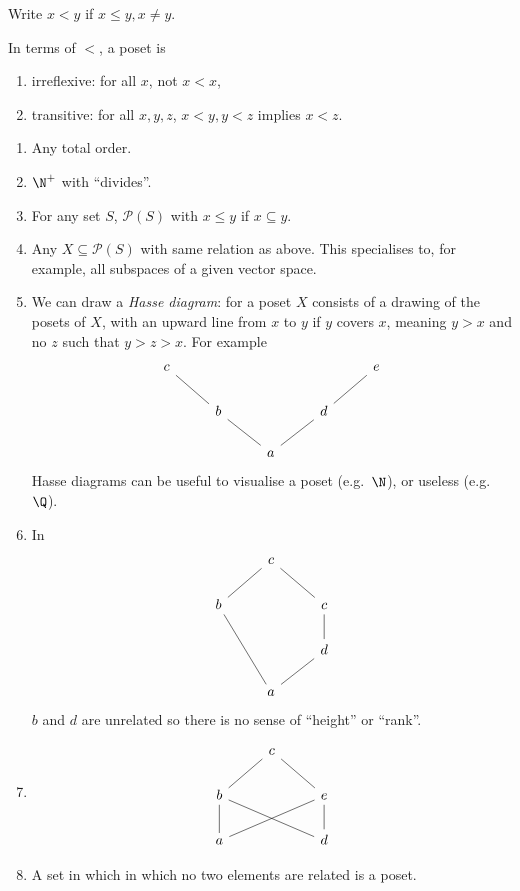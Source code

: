 \documentclass[a4paper]{article}
\begin{document}
\begin{notation}
  Write \(x < y\) if \(x \leq y, x \neq y\).

  In terms of \(<\), a poset is
  \begin{enumerate}
  \item irreflexive: for all \(x\), not \(x < x\),
  \item transitive: for all \(x, y, z\), \(x < y, y < z\) implies \(x < z\).
  \end{enumerate}
\end{notation}

\begin{eg}\leavevmode
  \begin{enumerate}
  \item Any total order.
  \item \(\N^+\) with ``divides''.
  \item For any set \(S\), \(\mathcal P(S)\) with \(x \leq y\) if \(x \subseteq y\).
  \item Any \(X \subseteq \mathcal P(S)\) with same relation as above. This specialises to, for example, all subspaces of a given vector space.
  \item We can draw a \emph{Hasse diagram}: for a poset \(X\) consists of a drawing of the posets of \(X\), with an upward line from \(x\) to \(y\) if \(y\) covers \(x\), meaning \(y > x\) and no \(z\) such that \(y > z > x\). For example
    \[
      \begin{tikzcd}
        c \ar[dr, dash] & & & & e \ar[dl, dash] \\
        & b \ar[dr, dash] & & d \ar[dl, dash] \\
        & & a
      \end{tikzcd}
    \]
    Hasse diagrams can be useful to visualise a poset (e.g.\ \(\N\)), or useless (e.g.\ \(\Q\)).
  \item In
    \[
      \begin{tikzcd}
        & c \ar[dl, dash] \ar[dr, dash] \\
        b \ar[ddr, dash] & & c \ar[d, dash] \\
        & & d \ar[dl, dash] \\
        & a
      \end{tikzcd}
    \]
    \(b\) and \(d\) are unrelated so there is no sense of ``height'' or ``rank''.
  \item
    \[
      \begin{tikzcd}
        & c \ar[dl, dash] \ar[dr, dash] \\
        b \ar[d, dash] \ar[drr, dash] & & e \ar[d, dash] \ar[dll, dash] \\
        a & & d
      \end{tikzcd}
    \]
  \item A set in which in which no two elements are related is a poset.
  \end{enumerate}
\end{eg}
\end{document}
